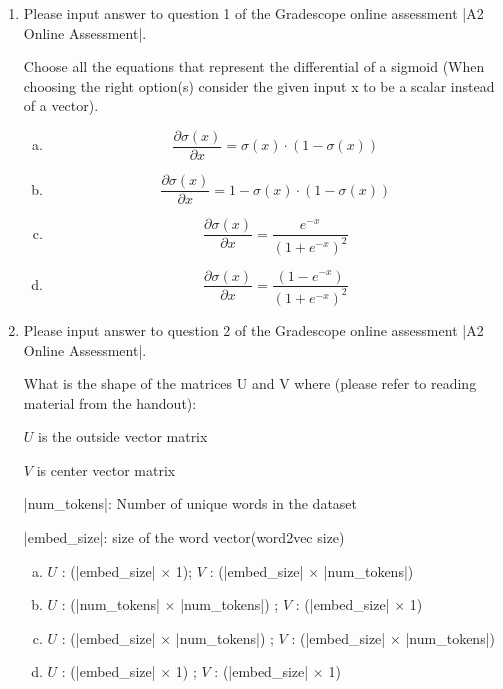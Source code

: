 \begin{enumerate}[1.]
\item {}
Please input answer to question 1 of the Gradescope online assessment |A2 Online Assessment|.

Choose all the equations that represent the differential of a sigmoid (When choosing the right option(s) consider the given input x to be a scalar instead of a vector).
\begin{enumerate}[(a)]
\item \begin{equation*}\frac{\partial \sigma(x)}{\partial x} = {\sigma(x) \cdot (1-\sigma(x))}\end{equation*}
\item \begin{equation*}\frac{\partial \sigma(x)}{\partial x} = 1 - {\sigma(x) \cdot (1-\sigma(x))}\end{equation*}
\item \begin{equation*}\frac{\partial \sigma(x)}{\partial x} = \frac{e^{-x}}{(1+e^{-x})^2}\end{equation*}
\item \begin{equation*}\frac{\partial \sigma(x)}{\partial x} = \frac{ (1-e^{-x})}{(1+e^{-x})^2}\end{equation*}
\end{enumerate}


\item {}
Please input answer to question 2 of the Gradescope online assessment |A2 Online Assessment|.

What is the shape of the matrices U and V where (please refer to reading material from the handout):

$U$ is the outside vector matrix

$V$ is center vector matrix

|num_tokens|: Number of unique words in the dataset

|embed_size|: size of the word vector(word2vec size)

\begin{enumerate}[(a)]
\item $U$ : (|embed_size| $\times$ 1); $V$ : (|embed_size| $\times$ |num_tokens|)
\item $U$ : (|num_tokens| $\times$ |num_tokens|) ; $V$ : (|embed_size| $\times$ 1)
\item $U$ : (|embed_size| $\times$ |num_tokens|) ; $V$ : (|embed_size| $\times$ |num_tokens|) 
\item $U$ : (|embed_size| $\times$ 1) ; $V$ : (|embed_size| $\times$ 1) 
\end{enumerate}


\end{enumerate}
